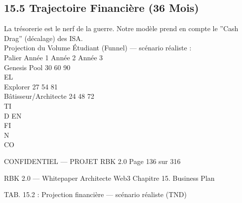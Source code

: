 \subsection{15.5 Trajectoire Financière (36 Mois)}
La trésorerie est le nerf de la guerre. Notre modèle prend en compte le ”Cash Drag” (décalage) des ISA.\\
Projection du Volume Étudiant (Funnel) — scénario réaliste :\\
\vspace{0.5em}
Palier               Année 1 Année 2 Année 3\\
Genesis Pool           30      60      90\\
\vspace{0.5em}
\vspace{0.5em}
\vspace{0.5em}
\vspace{0.5em}
EL\\
Explorer               27      54      81\\
Bâtisseur/Architecte   24      48      72\\
\vspace{0.5em}
\vspace{0.5em}
\vspace{0.5em}
\vspace{0.5em}
TI\\
D   EN\\
FI\\
N\\
CO\\
\vspace{0.5em}
\vspace{0.5em}
\vspace{0.5em}
\vspace{0.5em}
\begin{confidential}CONFIDENTIEL — PROJET RBK 2.0                               Page 136 sur 316\end{confidential}
RBK 2.0 — Whitepaper Architecte Web3                                                                                Chapitre 15. Business Plan\\
\vspace{0.5em}
\vspace{0.5em}
\begin{center}\begin{tabular}TAB. 15.2 : Projection financière — scénario réaliste (TND)\end{tabular}\end{center}
\vspace{0.5em}

